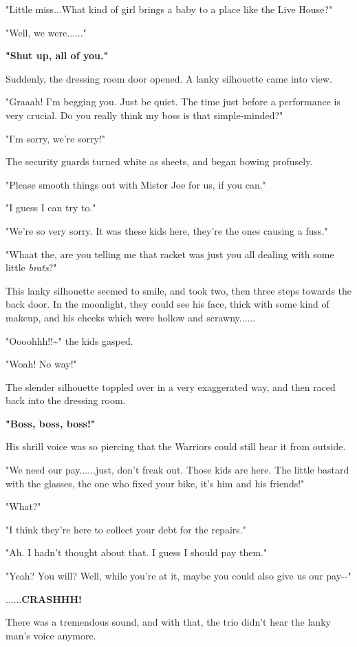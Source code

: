 \documentclass[
]{article}
\begin{document}
"Little miss...What kind of girl brings a baby to a place like the Live
House?"

"Well, we were......"

\textbf{"Shut up, all of you."}

Suddenly, the dressing room door opened. A lanky silhouette came into
view.

"Graaah! I'm begging you. Just be quiet. The time just before a
performance is very crucial. Do you really think my boss is that
simple-minded?"

"I'm sorry, we're sorry!"

The security guards turned white as sheets, and began bowing profusely.

"Please smooth things out with Mister Joe for us, if you can."

"I guess I can try to."

"We're so very sorry. It was these kids here, they're the ones causing a
fuss."

"Whaat the, are you telling me that racket was just you all dealing with
some little \emph{brats}?"

This lanky silhouette seemed to smile, and took two, then three steps
towards the back door. In the moonlight, they could see his face, thick
with some kind of makeup, and his cheeks which were hollow and
scrawny......

"Oooohhh!!\textasciitilde" the kids gasped.

"Woah! No way!"

The slender silhouette toppled over in a very exaggerated way, and then
raced back into the dressing room.

\textbf{"Boss, boss, boss!"}

His shrill voice was so piercing that the Warriors could still hear it
from outside.

"We need our pay......just, don't freak out. Those kids are here. The
little bastard with the glasses, the one who fixed your bike, it's him
and his friends!"

"What?"

"I think they're here to collect your debt for the repairs."

"Ah. I hadn't thought about that. I guess I should pay them."

"Yeah? You will? Well, while you're at it, maybe you could also give us
our pay-\/-"

......\textbf{CRASHHH!}

There was a tremendous sound, and with that, the trio didn't hear the
lanky man's voice anymore.
\end{document}
